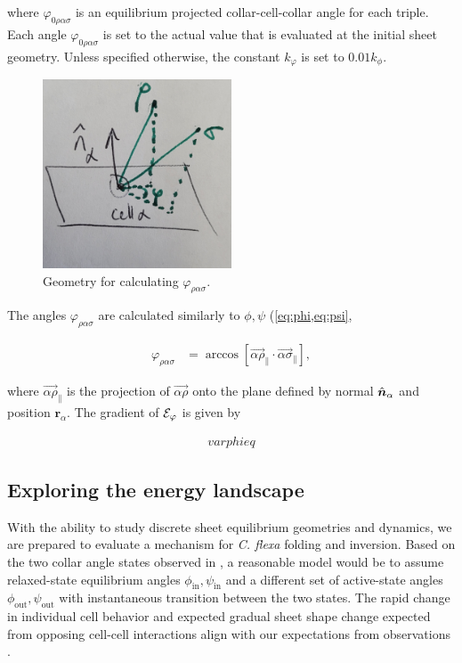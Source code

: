 \noindent where $\varphi_{0\rho\alpha\sigma}$ is an equilibrium projected collar-cell-collar angle for each triple. 
Each angle $\varphi_{0\rho\alpha\sigma}$ is set to the actual value that is evaluated at the initial sheet geometry.
Unless specified otherwise, the constant $k_\varphi$ is set to $0.01k_\phi$.

\begin{figure}
	\centering 
	\includegraphics[width=0.5\textwidth]{varphi.jpg}
	\caption{Geometry for calculating $\varphi_{\rho\alpha\sigma}$.}
	\label{fig:varphi}
\end{figure}

The angles $\varphi_{\rho\alpha\sigma}$ are calculated similarly to $\phi, \psi$ (\cref{eq:phi,eq:psi},

\begin{align}
	\varphi_{\rho\alpha\sigma} &= \arccos \left[\vec{\alpha\rho}_\| \cdot \vec{\alpha\sigma}_\| \right], \label{eq:varphi}
\end{align}

\noindent where $\vec{\alpha\rho}_\|$ is the projection of $\vec{\alpha\rho}$ onto the plane defined by normal $\hat{\bm{n}}_\alpha$ and position $\bm{r}_\alpha$. 
The gradient of $\mathcal{E}_\varphi$ is given by 

\begin{align}
	varphi eq \label{eq:grad_varphi}
\end{align}

\subsection{Exploring the energy landscape}

With the ability to study discrete sheet equilibrium geometries and dynamics, we are prepared to evaluate a mechanism for \textit{C. flexa} folding and inversion. 
Based on the two collar angle states observed in \citet{brunet2019}, a reasonable model would be to assume relaxed-state equilibrium angles $\phi_{\text{in}}, \psi_{\text{in}}$ and a different set of active-state angles $\phi_{\text{out}}, \psi_{\text{out}}$ with instantaneous transition between the two states. 
The rapid change in individual cell behavior and expected gradual sheet shape change expected from opposing cell-cell interactions align with our expectations from observations \citet{brunet2019}. 

